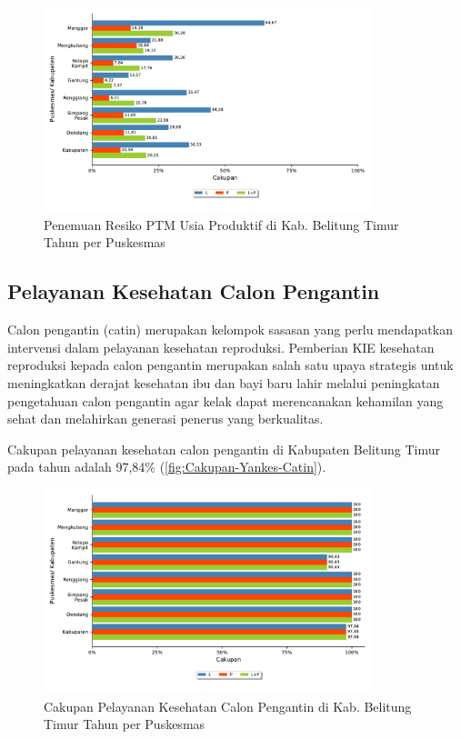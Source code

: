 \begin{figure}[H]
    \centering
    \includegraphics[width=0.85\textwidth]{bab_05/bab_05_28_skriningProduktif_b}
    \caption{Penemuan Resiko PTM Usia Produktif di Kab. Belitung Timur Tahun \tP per Puskesmas}
    \label{fig:Cakupan-Resiko-PTM-Usprod}
\end{figure}

\subsection{Pelayanan Kesehatan Calon Pengantin}
Calon pengantin (catin) merupakan kelompok sasasan yang perlu mendapatkan intervensi dalam pelayanan kesehatan reproduksi.
Pemberian KIE kesehatan reproduksi kepada calon pengantin merupakan salah satu upaya strategis untuk meningkatkan derajat kesehatan ibu dan bayi baru lahir melalui peningkatan pengetahuan calon pengantin agar kelak dapat merencanakan kehamilan yang sehat dan melahirkan generasi penerus yang berkualitas.

Cakupan pelayanan kesehatan calon pengantin di Kabupaten Belitung Timur pada tahun \tP adalah 97,84\% (\autoref{fig:Cakupan-Yankes-Catin}).

\begin{figure}[H]
	\centering
	\includegraphics[width=0.85\textwidth]{bab_05/bab_05_29a_pelayananCatin}
	\caption{Cakupan Pelayanan Kesehatan Calon Pengantin di Kab. Belitung Timur Tahun \tP per Puskesmas}
	\label{fig:Cakupan-Yankes-Catin}
\end{figure}

